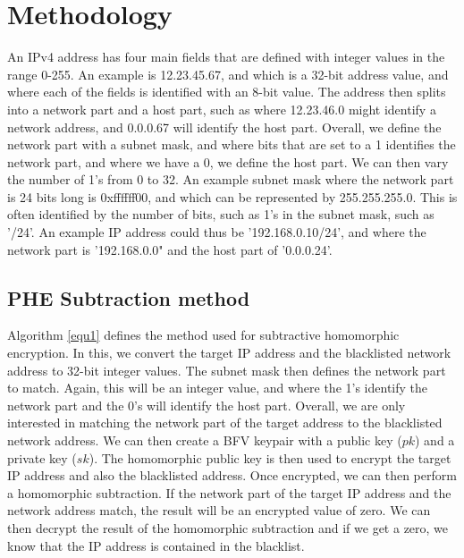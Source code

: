 \documentclass[envcountsame,runningheads,notitlepage]{llncs}
\begin{document}
\section{Methodology}
An IPv4 address has four main fields that are defined with integer values in the range 0-255. An example is 12.23.45.67, and which is a 32-bit address value, and where each of the fields is identified with an 8-bit value. The address then splits into a network part and a host part, such as where 12.23.46.0 might identify a network address, and 0.0.0.67 will identify the host part. Overall, we define the network part with a subnet mask, and where bits that are set to a 1 identifies the network part, and where we have a 0, we define the host part. We can then vary the number of 1's from 0 to 32. An example subnet mask where the network part is 24 bits long is 0xffffff00, and which can be represented by 255.255.255.0. This is often identified by the number of bits, such as 1's in the subnet mask, such as '/24'. An example IP address could thus be '192.168.0.10/24', and where the network part is '192.168.0.0" and the host part of '0.0.0.24'.

\subsection{PHE Subtraction method}

Algorithm \ref{equ1} defines the method used for subtractive homomorphic encryption. In this, we convert the target IP address and the blacklisted network address to 32-bit integer values. The subnet mask then defines the network part to match. Again, this will be an integer value, and where the 1's identify the network part and the 0's will identify the host part. Overall, we are only interested in matching the network part of the target address to the blacklisted network address. We can then create a BFV keypair with a public key ($pk$) and a private key ($sk$). The homomorphic public key is then used to encrypt the target IP address and also the blacklisted address. Once encrypted, we can then perform a homomorphic subtraction. If the network part of the target IP address and the network address match, the result will be an encrypted value of zero. We can then decrypt the result of the homomorphic subtraction and if we get a zero, we know that the IP address is contained in the blacklist.  
\end{document}
